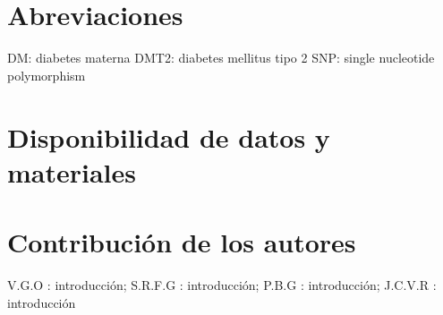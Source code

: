 \documentclass{bmcart}
\begin{document}
\begin{frontmatter}
\begin{abstractbox}
\begin{abstract}
			
			\end{abstract}
			
			
			\begin{keyword}
			\end{keyword}
		
		
		\end{abstractbox}
	
	\end{frontmatter}
	
	
	
	
	
	
	
	
	
	
	
	\begin{backmatter}
	
		\section*{Abreviaciones}%
		DM: diabetes materna
		DMT2: diabetes mellitus tipo 2
		SNP: single nucleotide polymorphism 
		
		\section*{Disponibilidad de datos y materiales}%
		
		\section*{Contribución de los autores}
			V.G.O : introducción; S.R.F.G : introducción; P.B.G : introducción; J.C.V.R : introducción
		
		
		
	
	\end{backmatter}
\end{document}
